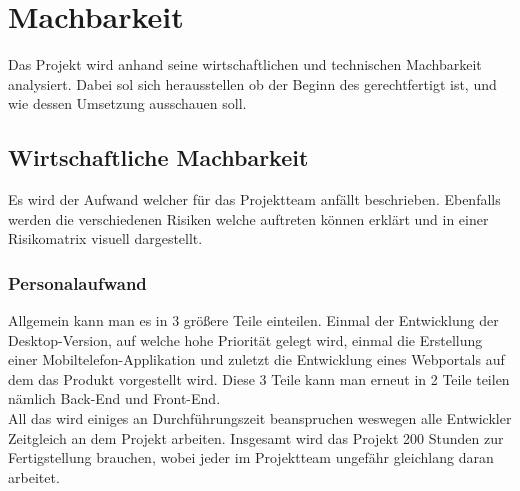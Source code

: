 \section{Machbarkeit}
Das Projekt wird anhand seine wirtschaftlichen und technischen Machbarkeit analysiert. Dabei sol sich herausstellen ob der Beginn des gerechtfertigt ist, und wie dessen Umsetzung ausschauen soll.

\subsection{Wirtschaftliche Machbarkeit}
Es wird der Aufwand welcher für das Projektteam anfällt beschrieben. Ebenfalls werden die verschiedenen Risiken welche auftreten können erklärt und in einer Risikomatrix visuell dargestellt.
\subsubsection{Personalaufwand}
Allgemein kann man es in 3 größere Teile einteilen. Einmal der Entwicklung der Desktop-Version, auf welche hohe Priorität gelegt wird, einmal die Erstellung einer Mobiltelefon-Applikation und zuletzt die Entwicklung eines Webportals auf dem das Produkt vorgestellt wird. Diese 3 Teile kann man erneut in 2 Teile teilen nämlich Back-End und Front-End.
\\
All das wird einiges an Durchführungszeit beanspruchen weswegen alle Entwickler Zeitgleich an dem Projekt arbeiten. Insgesamt wird das Projekt 200 Stunden zur Fertigstellung brauchen, wobei jeder im Projektteam ungefähr gleichlang daran arbeitet.
\newpage
